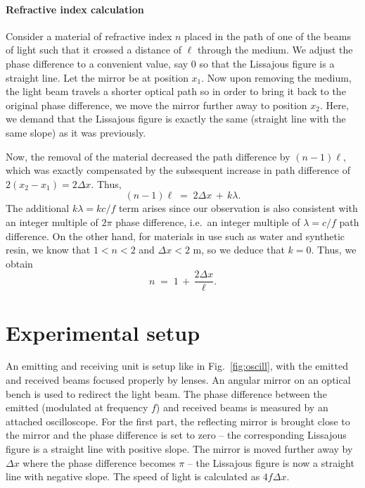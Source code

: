 \documentclass[11pt]{article}
\begin{document}
        \paragraph{Refractive index calculation}
        Consider a material of refractive index $n$ placed in the path of one of the beams of light such that it crossed a distance of
        $\ell$ through the medium. We adjust the phase difference to a convenient value, say $0$ so that the Lissajous figure is a straight line.
        Let the mirror be at position $x_1$. Now upon removing the medium, the light beam travels a shorter optical path so in order to 
        bring it back to the original phase difference, we move the mirror further away to position $x_2$. Here, we demand that the
        Lissajous figure is exactly the same (straight line with the same slope) as it was previously.

        Now, the removal of the material decreased the path difference by $(n - 1)\ell$, which was exactly compensated by the subsequent
        increase in path difference of $2(x_2 - x_1) = 2\Delta x$. Thus,
        \[
                (n - 1)\ell \;=\; 2\Delta x \,+\, k\lambda.
        \]
        The additional $k\lambda = k c/f$ term arises since our observation is also consistent with an integer multiple of $2\pi$ phase difference,
        i.e.\ an integer multiple of $\lambda = c /f$ path difference. On the other hand, for materials in use such as water and synthetic resin,
        we know that $1 < n < 2$ and $\Delta x < 2$ m, so we deduce that $k = 0$. Thus, we obtain
        \[
                n \;=\; 1 \,+\, \frac{2\Delta x}{\ell}.
        \]
        
        \section{Experimental setup}
        An emitting and receiving unit is setup like in Fig.~\ref{fig:oscill}, with the emitted and received beams focused properly by lenses.
        An angular mirror on an optical bench is used to redirect the light beam. The phase difference between the emitted (modulated at frequency $f$) 
        and received beams is measured by an attached oscilloscope. For the first part, the reflecting mirror is brought close to the mirror and the 
        phase difference is set to zero -- the corresponding Lissajous figure is a straight line with positive slope. The mirror is moved
        further away by $\Delta x$ where the phase difference becomes $\pi$ -- the Lissajous figure is now a straight line with negative slope.
        The speed of light is calculated as $4f\Delta x$.
\end{document}
